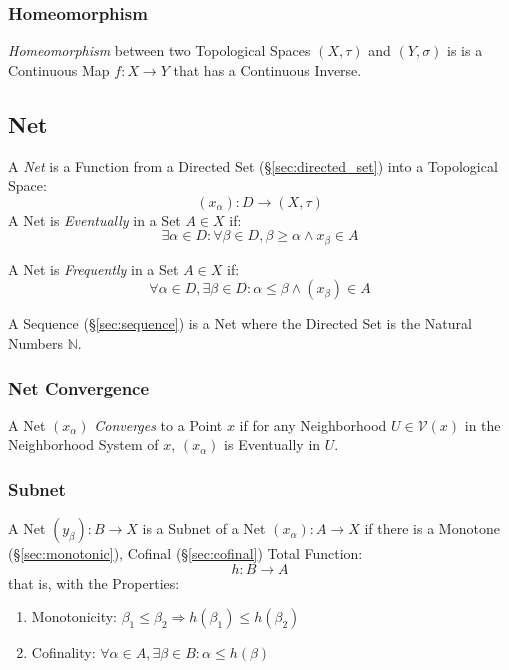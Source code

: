 \subsubsection{Homeomorphism}\label{sec:homeomorphism}

\emph{Homeomorphism} between two Topological Spaces $(X, \tau)$ and
$(Y, \sigma)$ is is a Continuous Map $f : X \rightarrow Y$ that has a
Continuous Inverse.



\subsection{Net}\label{sec:net}

A \emph{Net} is a Function from a Directed Set
(\S\ref{sec:directed_set}) into a Topological Space:
\[
  (x_\alpha) : D \rightarrow (X, \tau)
\]
A Net is \emph{Eventually} in a Set $A \in X$ if:
\[
  \exists \alpha \in D
  : \forall \beta \in D, \beta \geq \alpha \wedge x_\beta \in A
\]

A Net is \emph{Frequently} in a Set $A \in X$ if:
\[
  \forall \alpha \in D, \exists \beta \in D
  : \alpha \leq \beta \wedge (x_\beta) \in A
\]

A Sequence (\S\ref{sec:sequence}) is a Net where the Directed Set is
the Natural Numbers $\mathbb{N}$.



\subsubsection{Net Convergence}\label{sec:net_convergence}

A Net $(x_\alpha)$ \emph{Converges} to a Point $x$ if for any
Neighborhood $U \in \mathcal{V}(x)$ in the Neighborhood System of $x$,
$(x_\alpha)$ is Eventually in $U$.



\subsubsection{Subnet}\label{sec:subnet}

A Net $(y_\beta) : B \rightarrow X$ is a Subnet of a Net $(x_\alpha) :
A \rightarrow X$ if there is a Monotone (\S\ref{sec:monotonic}),
Cofinal (\S\ref{sec:cofinal}) Total Function:
\[
  h : B \rightarrow A
\]
that is, with the Properties:
\begin{enumerate}
  \item Monotonicity:
  $\beta_1 \leq \beta_2 \Rightarrow h(\beta_1) \leq h(\beta_2)$
  \item Cofinality:
   $\forall \alpha \in A, \exists \beta \in B : \alpha \leq h(\beta)$
\end{enumerate}



